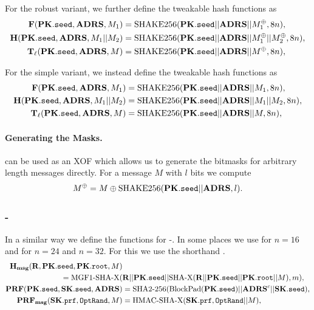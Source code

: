     For the robust variant, we further define the tweakable hash functions as
    \begin{equation}
      \begin{aligned}
         \mathbf{F}(\mathbf{PK}.\texttt{seed}, \textbf{ADRS}, M_1) &= \text{SHAKE256}(\mathbf{PK}.\texttt{seed} || \textbf{ADRS} || M_1^{\oplus}, 8n),\\
         \mathbf{H}(\mathbf{PK}.\texttt{seed}, \textbf{ADRS}, M_1 || M_2) &= \text{SHAKE256}(\mathbf{PK}.\texttt{seed} || \textbf{ADRS} || M_1^{\oplus} || M_2^{\oplus}, 8n),\\
         \mathbf{T}_\ell(\mathbf{PK}.\texttt{seed}, \textbf{ADRS}, M) &= \text{SHAKE256}(\mathbf{PK}.\texttt{seed} || \textbf{ADRS} || M^{\oplus}, 8n),\\
      \end{aligned}
    \end{equation}

    For the simple variant, we instead define the tweakable hash functions as
    \begin{equation}
      \begin{aligned}
         \mathbf{F}(\mathbf{PK}.\texttt{seed}, \textbf{ADRS}, M_1) &= \text{SHAKE256}(\mathbf{PK}.\texttt{seed} || \textbf{ADRS} || M_1, 8n),\\
         \mathbf{H}(\mathbf{PK}.\texttt{seed}, \textbf{ADRS}, M_1 || M_2) &= \text{SHAKE256}(\mathbf{PK}.\texttt{seed} || \textbf{ADRS} || M_1 || M_2, 8n),\\
         \mathbf{T}_\ell(\mathbf{PK}.\texttt{seed}, \textbf{ADRS}, M) &= \text{SHAKE256}(\mathbf{PK}.\texttt{seed} || \textbf{ADRS} || M, 8n),\\
      \end{aligned}
    \end{equation}

   \paragraph{Generating the Masks.} \shathree can be used as an XOF which 
   allows us to generate the bitmasks for arbitrary length messages directly. 
   For a message $M$ with $l$ bits we compute
   \begin{equation*}
      M^{\oplus} = M \oplus \text{SHAKE256}(\mathbf{PK}.\texttt{seed} || \textbf{ADRS}, l).
   \end{equation*}

\subsubsection{\spx-\shatwo}
   In a similar way we define the functions for \spx-\shatwo. In some places we use \shatwofs for $n = 16$ and \shatwofivetwelve for $n=24$ and $n=32$. For this we use the shorthand \shaX.
   \begin{equation}
   \begin{aligned}
      \mathbf{H_{msg}}(\mathbf{R},\mathbf{PK}.\texttt{seed}, \mathbf{PK}.\texttt{root}, M) &\\
              = \text{MGF1-}\text{SHA-X}(&\mathbf{R} || \mathbf{PK}.\texttt{seed} || \text{SHA-X}(\mathbf{R} || \mathbf{PK}.\texttt{seed} || \mathbf{PK}.\texttt{root} || M), m),\\
      \mathbf{PRF}(\mathbf{PK}.\texttt{seed}, \mathbf{SK}.\texttt{seed}, \textbf{ADRS}) &= \text{SHA2-256}(\text{BlockPad}(\mathbf{PK}.\texttt{seed})|| \textbf{ADRS}^{c} || \mathbf{SK}.\texttt{seed}),\\
      \mathbf{PRF_{msg}}(\mathbf{SK}.\texttt{prf}, \texttt{OptRand}, M) &= \text{HMAC-}\text{SHA-X}(\mathbf{SK}.\texttt{prf}, \texttt{OptRand} || M),\\
   \end{aligned}
   \end{equation}

